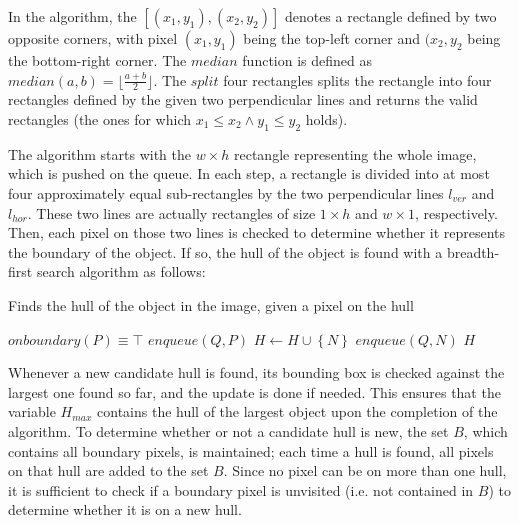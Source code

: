 \documentclass[times, utf8, zavrsni]{fer}
\begin{document}
In the algorithm, the $[(x_1, y_1), (x_2, y_2)]$ denotes a rectangle defined by
two opposite corners, with pixel $(x_1, y_1)$ being the top-left corner and
$(x_2, y_2$ being the bottom-right corner. The $median$ function is defined as
$median(a, b) = \lfloor{\frac{a + b}{2}}\rfloor$. The $split$ four rectangles
splits the rectangle into four rectangles defined by the given two perpendicular
lines and returns the valid rectangles (the ones for which $x_1 \leq x_2 \land
y_1 \leq y_2$ holds).

The algorithm starts with the $w \times h$ rectangle representing the whole
image, which is pushed on the queue. In each step, a rectangle is divided into
at most four approximately equal sub-rectangles by the two perpendicular lines
$l_{ver}$ and $l_{hor}$. These two lines are actually rectangles of size $1
\times h$ and $w \times 1$, respectively. Then, each pixel on those two lines is
checked to determine whether it represents the boundary of the object. If so,
the hull of the object is found with a breadth-first search algorithm as
follows:

\begin{algorithm} 
\caption{Finds the hull of the object in the image, given a pixel on the hull}
\label{algo:hull-bfs}
\begin{algorithmic}
\REQUIRE $onboundary(P) \equiv \top$  
\STATE $enqueue(Q, P)$
\STATE $H \gets H \cup \left\{N\right\}$
\STATE $enqueue(Q, N)$
\ENDIF
\ENDFOR
\ENDWHILE
\RETURN $H$
\end{algorithmic}
\end{algorithm}

Whenever a new candidate hull is found, its bounding box is checked against the
largest one found so far, and the update is done if needed. This ensures that
the variable $H_{max}$ contains the hull of the largest object upon the
completion of the algorithm. To determine whether or not a candidate hull is
new, the set $B$, which contains all boundary pixels, is maintained; each time a
hull is found, all pixels on that hull are added to the set $B$. Since no pixel
can be on more than one hull, it is sufficient to check if a boundary pixel is
unvisited (i.e. not contained in $B$) to determine whether it is on a new hull.
\end{document}

